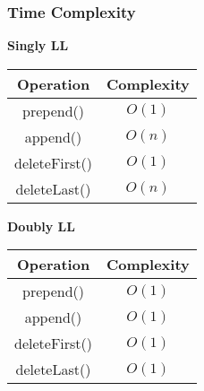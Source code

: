 \documentclass[10pt, 
a4paper, 
oneside, 
headinclude, footinclude, 
BCOR5mm]
{scrartcl}
\begin{document}
\subsubsection{Time Complexity}
\textbf{Singly LL}
\begin{center}
    \begin{tabular}{|c|c|}
        \hline
        \textbf{Operation} & \textbf{Complexity} \\
        \hline
        prepend() & $O(1)$ \\
        \hline
        append() & $O(n)$ \\
        \hline
        deleteFirst() & $O(1)$ \\
        \hline
        deleteLast() & $O(n)$ \\
        \hline
    \end{tabular}
\end{center}
\textbf{Doubly LL}
\begin{center}
    \begin{tabular}{|c|c|}
        \hline
        \textbf{Operation} & \textbf{Complexity} \\
        \hline
        prepend() & $O(1)$ \\
        \hline
        append() & $O(1)$ \\
        \hline
        deleteFirst() & $O(1)$ \\
        \hline
        deleteLast() & $O(1)$ \\
        \hline
    \end{tabular}
\end{center}
\end{document}
